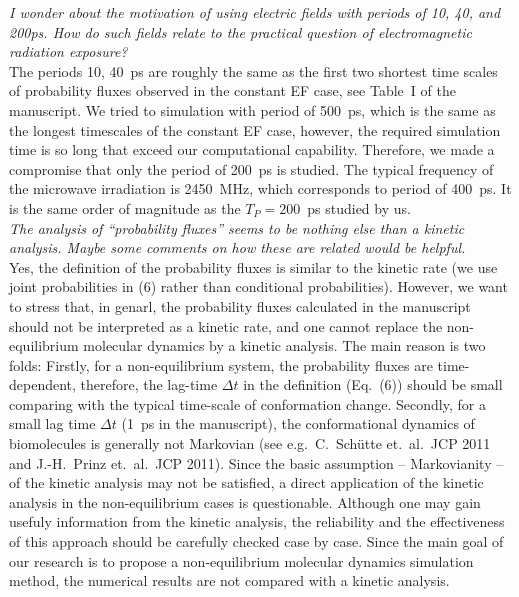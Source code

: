 \documentclass[]{revtex4-1}
\begin{document}
\emph{ I wonder about the motivation of using electric fields with
  periods of 10, 40, and 200ps. How do such fields relate to the
  practical question of electromagnetic radiation exposure?  }\\

The periods 10, 40~ps are roughly the same as the first two shortest
time scales of probability fluxes observed in the constant EF case,
see Table~I of the manuscript. We tried to simulation with period of
500~ps, which is the same as the longest timescales of the constant EF
case, however, the required simulation time is so long that exceed our
computational capability. Therefore, we made a compromise that only
the period of 200~ps is studied. The typical frequency of the microwave
irradiation is 2450~MHz, which corresponds to period of 400~ps. It is
the same order of magnitude as the $T_P=200$~ps studied by us.
\\

\emph{ The analysis of ``probability fluxes'' seems to be nothing else
  than a kinetic analysis. Maybe some comments on how these are
  related would be helpful.  }\\

Yes, the definition of the probability fluxes is similar to the
kinetic rate (we use joint probabilities in (6) rather than
conditional probabilities). However, we want to stress that, in genarl,
the probability fluxes calculated in the manuscript should not be
interpreted as a kinetic rate, and one cannot replace the
non-equilibrium molecular dynamics by a kinetic analysis. The main
reason is two folds:
Firstly, for a non-equilibrium system, the probability fluxes are
time-dependent, therefore, the lag-time $\Delta t$ in the definition (Eq.~(6))
should be small comparing with the typical time-scale of conformation change.
Secondly, for a small lag time $\Delta t$ (1~ps in the manuscript), the conformational
dynamics of biomolecules is generally not
Markovian (see e.g.~C.~Sch\"utte et.~al.~JCP 2011 and J.-H.~Prinz et.~al.~JCP 2011).
Since the basic assumption -- Markovianity -- of the kinetic analysis
may not be satisfied, a direct
application of the kinetic analysis in the non-equilibrium cases is questionable. Although one may
gain usefuly information from the kinetic analysis, the reliability
and the effectiveness of this approach should be carefully checked case
by case.  Since the main goal of our research is to propose a
non-equilibrium molecular dynamics simulation method, the numerical
results are not compared with a kinetic analysis.
\end{document}

